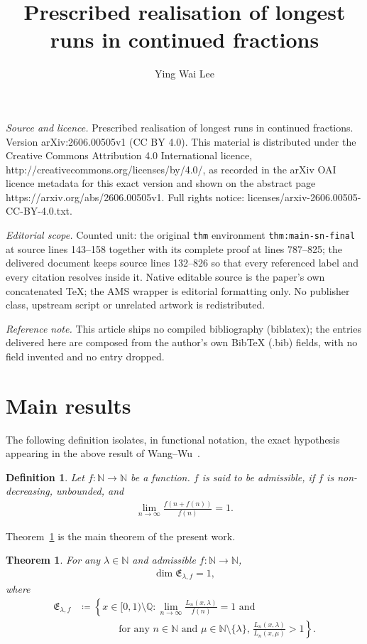 \documentclass[10pt,a4paper]{amsart}
\newtheorem{defi}{Definition}
\newtheorem{thm}{Theorem}
\begin{document}
\title[Prescribed realisation of longest runs in continued fraction]{Prescribed realisation of longest runs in continued fractions}
\author{Ying Wai Lee}
\date{}
\maketitle
\noindent\emph{Source and licence.} Prescribed realisation of longest runs in continued fractions. Version arXiv:2606.00505v1 (CC BY 4.0). This material is distributed under the Creative Commons Attribution 4.0 International licence, http://creativecommons.org/licenses/by/4.0/, as recorded in the arXiv OAI licence metadata for this exact version and shown on the abstract page https://arxiv.org/abs/2606.00505v1. Full rights notice: licenses/arxiv-2606.00505-CC-BY-4.0.txt.\par\smallskip
\noindent\textit{Editorial scope.} Counted unit: the original \texttt{thm} environment \texttt{thm:main-sn-final} at source lines 143--158 together with its complete proof at lines 787--825; the delivered document keeps source lines 132--826 so that every referenced label and every citation resolves inside it. Native editable source is the paper's own concatenated TeX; the AMS wrapper is editorial formatting only. No publisher class, upstream script or unrelated artwork is redistributed.
\par\smallskip\noindent\textit{Reference note.} This article ships no compiled bibliography (biblatex); the entries delivered here are composed from the author's own BibTeX (.bib) fields, with no field invented and no entry dropped.
\section{Main results}

The following definition isolates, in functional notation, the exact hypothesis appearing in the above result of Wang--Wu~\cite[Theorem~1.3]{WangWu2011}.
\begin{defi}
Let $f:\mathbb{N}\to\mathbb{N}$ be a function. $f$ is said to be admissible, if $f$ is non-decreasing, unbounded, and
\begin{align*}
    \lim_{n\to\infty}\frac{f(n+f(n))}{f(n)}=1.
\end{align*}
\end{defi}

Theorem~\ref{thm:main-sn-final} is the main theorem of the present work.

\begin{thm}
\label{thm:main-sn-final}
For any $\lambda\in\mathbb{N}$ and admissible $f:\mathbb{N}\to\mathbb{N}$, 
\begin{align*}
    \dim{\mathfrak{E}_{\lambda,f}}=1,
\end{align*}
where
\begin{align*}
    \mathfrak{E}_{\lambda,f}
    &\coloneqq
    \left\{x\in[0,1)\setminus\mathbb{Q}:
    \lim_{n\to\infty}\frac{L_n(x,\lambda)}{f(n)}=1
    \text{ and }\right.\\
    &\qquad\qquad\left.\text{for any $n\in\mathbb{N}$ and $\mu\in\mathbb{N}\setminus\{\lambda\}$, }\frac{L_n(x,\lambda)}{L_n(x,\mu)}>1\right\}.
\end{align*}
\end{thm}
\end{document}
